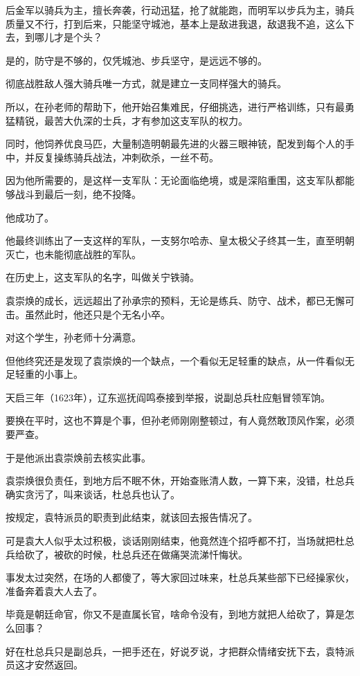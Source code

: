 \begin{multicols}{\theparacolNo}
		后金军以骑兵为主，擅长奔袭，行动迅猛，抢了就能跑，而明军以步兵为主，骑兵质量又不行，打到后来，只能坚守城池，基本上是敌进我退，敌退我不追，这么下去，到哪儿才是个头？

		是的，防守是不够的，仅凭城池、步兵坚守，是远远不够的。

		彻底战胜敌人强大骑兵唯一方式，就是建立一支同样强大的骑兵。

		所以，在孙老师的帮助下，他开始召集难民，仔细挑选，进行严格训练，只有最勇猛精锐，最苦大仇深的士兵，才有参加这支军队的权力。

		同时，他饲养优良马匹，大量制造明朝最先进的火器三眼神铳，配发到每个人的手中，并反复操练骑兵战法，冲刺砍杀，一丝不苟。

		因为他所需要的，是这样一支军队：无论面临绝境，或是深陷重围，这支军队都能够战斗到最后一刻，绝不投降。

		他成功了。

		他最终训练出了一支这样的军队，一支努尔哈赤、皇太极父子终其一生，直至明朝灭亡，也未能彻底战胜的军队。

		在历史上，这支军队的名字，叫做关宁铁骑。

		袁崇焕的成长，远远超出了孙承宗的预料，无论是练兵、防守、战术，都已无懈可击。虽然此时，他还只是个无名小卒。

		对这个学生，孙老师十分满意。

		但他终究还是发现了袁崇焕的一个缺点，一个看似无足轻重的缺点，从一件看似无足轻重的小事上。

		天启三年（1623年），辽东巡抚阎鸣泰接到举报，说副总兵杜应魁冒领军饷。

		要换在平时，这也不算是个事，但孙老师刚刚整顿过，有人竟然敢顶风作案，必须要严查。

		于是他派出袁崇焕前去核实此事。

		袁崇焕很负责任，到地方后不眠不休，开始查账清人数，一算下来，没错，杜总兵确实贪污了，叫来谈话，杜总兵也认了。

		按规定，袁特派员的职责到此结束，就该回去报告情况了。

		可是袁大人似乎太过积极，谈话刚刚结束，他竟然连个招呼都不打，当场就把杜总兵给砍了，被砍的时候，杜总兵还在做痛哭流涕忏悔状。

		事发太过突然，在场的人都傻了，等大家回过味来，杜总兵某些部下已经操家伙，准备奔着袁大人去了。

		毕竟是朝廷命官，你又不是直属长官，啥命令没有，到地方就把人给砍了，算是怎么回事？

		好在杜总兵只是副总兵，一把手还在，好说歹说，才把群众情绪安抚下去，袁特派员这才安然返回。


\end{multicols}
